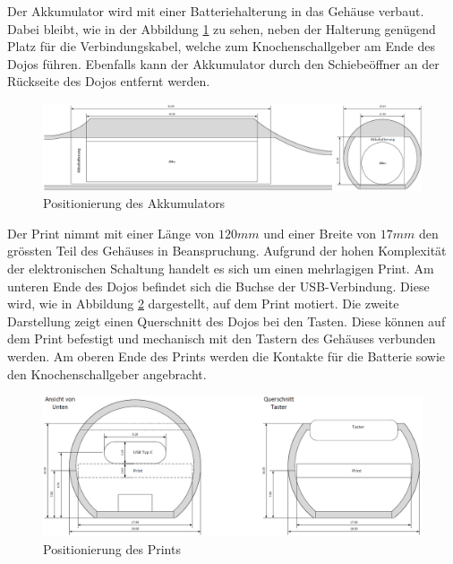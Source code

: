 \newpage

Der Akkumulator wird mit einer Batteriehalterung in das Gehäuse verbaut. Dabei bleibt, wie in der Abbildung \ref{fig:DojoAkkumulatorQuerschnitt} zu sehen, neben der Halterung genügend Platz für die Verbindungskabel, welche zum Knochenschallgeber am Ende des Dojos führen. Ebenfalls kann der Akkumulator durch den Schiebeöffner an der Rückseite des Dojos entfernt werden.


\begin{figure}[h]
	\centering
	\includegraphics[width=\textwidth]{graphics/DojoAkkumulatorQuerschnitt.png}
	\caption{Positionierung des Akkumulators}
	\label{fig:DojoAkkumulatorQuerschnitt}
\end{figure}

Der Print nimmt mit einer Länge von $120mm$ und einer Breite von $17mm$ den grössten Teil des Gehäuses in Beanspruchung. Aufgrund der hohen Komplexität der elektronischen Schaltung handelt es sich um einen mehrlagigen Print. Am unteren Ende des Dojos befindet sich die Buchse der USB-Verbindung. Diese wird, wie in Abbildung \ref{fig:DojoPrintQuerschnitt} dargestellt, auf dem Print motiert. Die zweite Darstellung zeigt einen Querschnitt des Dojos bei den Tasten. Diese können auf dem Print befestigt und mechanisch mit den Tastern des Gehäuses verbunden werden. Am oberen Ende des Prints werden die Kontakte für die Batterie sowie den Knochenschallgeber angebracht.


\begin{figure}[h]
	\centering
	\includegraphics[width=\textwidth]{graphics/DojoPrintQuerschnitt.png}
	\caption{Positionierung des Prints}
	\label{fig:DojoPrintQuerschnitt}
\end{figure}


